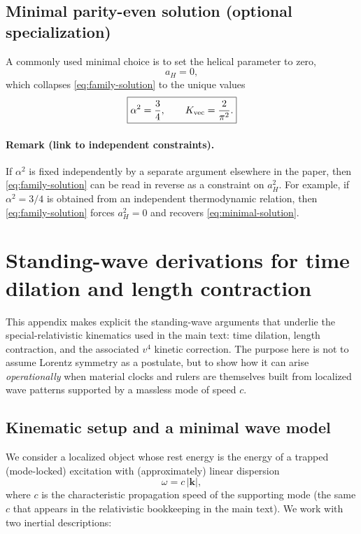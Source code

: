 \documentclass[11pt]{article}
\begin{document}
\subsection{Minimal parity-even solution (optional specialization)}
A commonly used minimal choice is to set the helical parameter to zero,
\begin{equation}
a_H = 0,
\end{equation}
which collapses \eqref{eq:family-solution} to the unique values
\begin{equation}
\boxed{
\alpha^2=\frac{3}{4},
\qquad
K_{\rm vec}=\frac{2}{\pi^2}.
}
\label{eq:minimal-solution}
\end{equation}

\paragraph{Remark (link to independent constraints).}
If \(\alpha^2\) is fixed independently by a separate argument elsewhere in the paper,
then \eqref{eq:family-solution} can be read in reverse as a constraint on \(a_H^2\).
For example, if \(\alpha^2=3/4\) is obtained from an independent thermodynamic relation,
then \eqref{eq:family-solution} forces \(a_H^2=0\) and recovers \eqref{eq:minimal-solution}.

\section{Standing-wave derivations for time dilation and length contraction}
\label{app:standing_wave_SR}

This appendix makes explicit the standing-wave arguments that underlie the
special-relativistic kinematics used in the main text: time dilation, length
contraction, and the associated $v^4$ kinetic correction. The purpose here is
not to assume Lorentz symmetry as a postulate, but to show how it can arise
\emph{operationally} when material clocks and rulers are themselves built from
localized wave patterns supported by a massless mode of speed $c$.

\subsection{Kinematic setup and a minimal wave model}
\label{app:standing_wave_setup}

We consider a localized object whose rest energy is the energy of a trapped
(mode-locked) excitation with (approximately) linear dispersion
\begin{equation}
\omega = c\,|\mathbf k| ,
\label{eq:app_dispersion}
\end{equation}
where $c$ is the characteristic propagation speed of the supporting mode
(the same $c$ that appears in the relativistic bookkeeping in the main text).
We work with two inertial descriptions:
\end{document}
